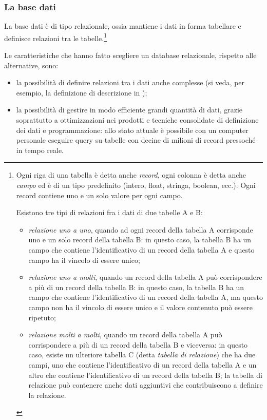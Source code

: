 \documentclass[twoside,stylearticle,11pt,filologia,it,article,bibsection]{spinoza}
\begin{document}

\subsubsection{La base dati}

La base dati è di tipo relazionale, ossia mantiene i dati in forma
tabellare e definisce relazioni tra le tabelle.\footnote{Ogni riga di
  una tabella è detta anche {\it record}, ogni colonna è detta anche
  {\it campo} ed è di un tipo predefinito (intero, float, stringa,
  boolean, ecc.). Ogni record contiene uno e un solo valore per ogni
  campo.

Esistono tre tipi di relazioni fra i dati di due tabelle A e B:
\begin{itemize}
\item {\it relazione uno a uno}, quando ad ogni record della tabella A
  corrisponde uno e un solo record della tabella B: in questo caso, la
  tabella B ha un campo che contiene l'identificativo di un record
  della tabella A e questo campo ha il vincolo di essere
  unico;
\item {\it relazione uno a molti}, quando un record della tabella A
  può corrispondere a più di un record della tabella B: in questo
  caso, la tabella B ha un campo che contiene l'identificativo di un
  record della tabella A, ma questo campo non ha il vincolo di essere
  unico e il valore contenuto può essere ripetuto;
\item {\it relazione molti a molti}, quando un record della tabella A
  può corrispondere a più di un record della tabella B e viceversa: in
  questo caso, esiste un ulteriore tabella C (detta {\it tabella di
    relazione}) che ha due campi, uno che contiene l'identificativo di
  un record della tabella A e un altro che contiene l'identificativo
  di un record della tabella B; la tabella di relazione può contenere
  anche dati aggiuntivi che contribuiscono a definire la relazione.
\end{itemize}
} 

Le caratteristiche che hanno fatto scegliere un database relazionale,
rispetto alle alternative, sono:
\begin{itemize}
\item la possibilità di definire relazioni tra i dati anche complesse
  (si veda, per esempio, la definizione di descrizione in
  );
\item la possibilità di gestire in modo efficiente grandi quantità di
  dati, grazie soprattutto a ottimizzazioni nei prodotti e tecniche
  consolidate di definizione dei dati e programmazione: allo stato
  attuale è possibile con un computer personale eseguire query su
  tabelle con decine di milioni di record pressoché in tempo reale.
\end{itemize}
\end{document}
